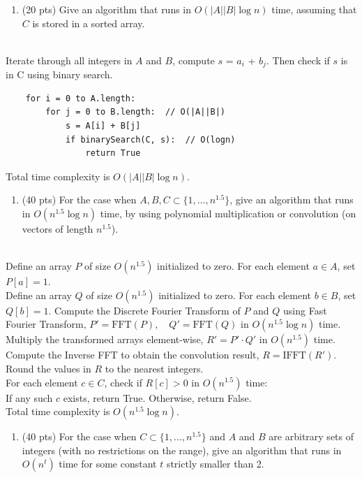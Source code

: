 \documentclass[11pt]{article}
\begin{document}
\begin{description}
\begin{enumerate}
\item[(a)] (20 pts)
Give an algorithm that runs in $O(|A||B|\log n)$ time, assuming that $C$ is
stored in a sorted array.
\end{enumerate}
\medskip
{}\\
Iterate through all integers in $A$ and $B$, compute $s$ = $a_i$ + $b_j$. Then check if $s$ is in C using binary search.
\begin{verbatim}
    for i = 0 to A.length:
        for j = 0 to B.length:  // O(|A||B|)
            s = A[i] + B[j]
            if binarySearch(C, s):  // O(logn)
                return True
\end{verbatim}
Total time complexity is $O(|A||B|\log n)$.

\medskip
\begin{enumerate}
\item[(b)] (40 pts)
For the case when $A,B,C\subset\{1,\ldots,n^{1.5}\}$, 
give an algorithm that runs in $O(n^{1.5}\log n)$ time, by using polynomial multiplication or convolution (on vectors of length $n^{1.5}$).
\end{enumerate}

\medskip
{}\\
Define an array $P$ of size $O(n^{1.5})$ initialized to zero. For each element $a \in A$, set $P[a] = 1$.\\
Define an array $Q$ of size $O(n^{1.5})$ initialized to zero. For each element $b \in B$, set $Q[b] = 1$.
Compute the Discrete Fourier Transform of $P$ and $Q$ using Fast Fourier Transform, 
$P' = \text{FFT}(P), \quad Q' = \text{FFT}(Q)$ in $O(n^{1.5} \log n)$ time.\\
Multiply the transformed arrays element-wise, $R' = P' \cdot Q'$ in $O(n^{1.5})$ time.\\
Compute the Inverse FFT to obtain the convolution result, $R = \text{IFFT}(R')$. Round the values in $R$ to the nearest integers.\\
For each element $c \in C$, check if $R[c] > 0$ in $O(n^{1.5})$ time:\\
If any such $c$ exists, return True. Otherwise, return False.\\
Total time complexity is $O(n^{1.5}\log n)$.


\medskip
\begin{enumerate}
\item[(c)] (40 pts)
For the case when $C\subset\{1,\ldots,n^{1.5}\}$ and $A$ and $B$ are arbitrary sets of integers
(with no restrictions on the range), give
an algorithm that runs in $O(n^t)$ time for some constant $t$ strictly smaller than 2.


\end{enumerate}
\end{description}
\end{document}
